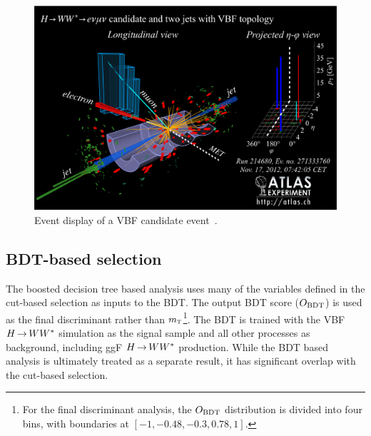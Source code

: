 \begin{figure}[h!]
  \centering
  \captionsetup{justification=centering}
  \includegraphics[width=\textwidth]{figures/eventdisplay}

  \caption{Event display of a VBF candidate event~\cite{WW2015}.}
  \label{fig:eventdisplay}
\end{figure}                                                                                     


\subsection{BDT-based selection}
\label{sec:vbf_bdt_def}
The boosted decision tree based analysis uses many of the variables defined in the cut-based selection as inputs to the BDT. The output BDT score ($O_{\rm BDT}$) is used as the final discriminant rather than $m_{\textrm{\footnotesize\sc t}}$\footnote{For the final discriminant analysis, the $O_{\rm BDT}$ distribution is divided into four bins, with boundaries at $[-1, -0.48, -0.3, 0.78, 1]$.}. The BDT is trained with the VBF $H{\,{\rightarrow}\,}WW^\ast$ simulation as the signal sample and all other processes as background, including ggF $H{\,{\rightarrow}\,}WW^\ast$ production. While the BDT based analysis is ultimately treated as a separate result, it has significant overlap with the cut-based selection. 

